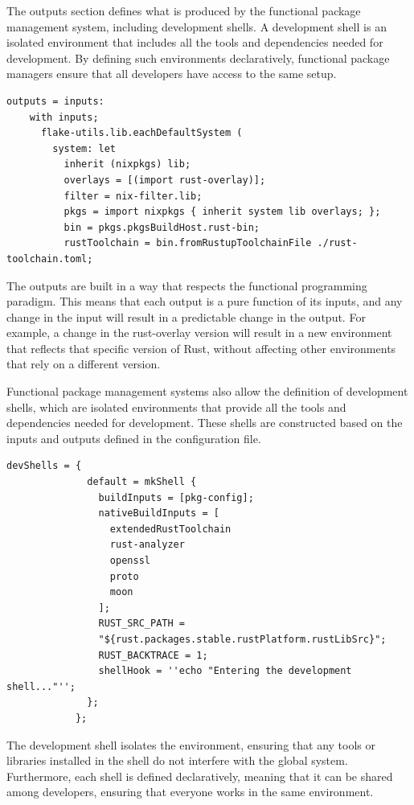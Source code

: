The outputs section defines what is produced by the functional package management
system, including development shells. A development shell is an isolated environment
that includes all the tools and dependencies needed for development. By defining
such environments declaratively, functional package managers ensure that all
developers have access to the same setup.

\begin{lstlisting}[caption={Outputs section for functional package management}]
  outputs = inputs:
    with inputs;
      flake-utils.lib.eachDefaultSystem (
        system: let
          inherit (nixpkgs) lib;
          overlays = [(import rust-overlay)];
          filter = nix-filter.lib;
          pkgs = import nixpkgs { inherit system lib overlays; };
          bin = pkgs.pkgsBuildHost.rust-bin;
          rustToolchain = bin.fromRustupToolchainFile ./rust-toolchain.toml;
\end{lstlisting}

The outputs are built in a way that respects the functional programming paradigm.
This means that each output is a pure function of its inputs, and any change in the
input will result in a predictable change in the output. For example, a change in
the rust-overlay version will result in a new environment that reflects that
specific version of Rust, without affecting other environments that rely on a
different version.

Functional package management systems also allow the definition of development
shells, which are isolated environments that provide all the tools and dependencies
needed for development. These shells are constructed based on the inputs and outputs
defined in the configuration file.

\begin{lstlisting}[caption={Development shell for functional package management}]
            devShells = {
              default = mkShell {
                buildInputs = [pkg-config];
                nativeBuildInputs = [
                  extendedRustToolchain
                  rust-analyzer
                  openssl
                  proto
                  moon
                ];
                RUST_SRC_PATH =
                "${rust.packages.stable.rustPlatform.rustLibSrc}";
                RUST_BACKTRACE = 1;
                shellHook = ''echo "Entering the development shell..."'';
              };
            };
\end{lstlisting}

The development shell isolates the environment, ensuring that any tools or
libraries installed in the shell do not interfere with the global system.
Furthermore, each shell is defined declaratively, meaning that it can be shared
among developers, ensuring that everyone works in the same environment.

